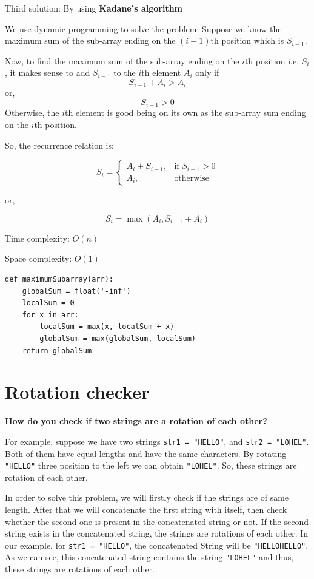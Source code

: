 \documentclass[a4paper,11pt]{book}
\begin{document}
\noindent Third solution: By using \textbf{Kadane's algorithm}

\noindent We use dynamic programming to solve the problem. Suppose we know the maximum sum of the sub-array ending on the $(i-1)$th position which is $S_{i-1}$.

\noindent Now, to find the maximum sum of the sub-array ending on the $i$th position i.e. $S_i$, it makes sense to add $S_{i-1}$ to the $i$th element $A_i$ only if 
$$S_{i-1} + A_i > A_i$$
or,
$$S_{i-1} > 0$$
\noindent Otherwise, the $i$th element is good being on its own as the sub-array sum ending on the $i$th position.

\noindent So, the recurrence relation is:

\[
    S_i = 
\begin{cases}
    A_i + S_{i-1} ,& \text{if } S_{i-1} > 0\\
    A_i,              & \text{otherwise}
\end{cases}
\]

or,

$$S_i = \max(A_i, S_{i-1} + A_i)$$

\noindent Time complexity: $O(n)$

\noindent Space complexity: $O(1)$

\begin{lstlisting}
def maximumSubarray(arr):
    globalSum = float('-inf')
    localSum = 0
    for x in arr:
        localSum = max(x, localSum + x)
        globalSum = max(globalSum, localSum)
    return globalSum
\end{lstlisting}

\newpage
\section{Rotation checker}
\textbf{How do you check if two strings are a rotation of each other?}
\vspace{5mm}

\noindent For example, suppose we have two strings \lstinline{str1 = "HELLO"}, and \lstinline{str2 = "LOHEL"}. Both of them have equal lengths and have the same characters. By rotating \lstinline{"HELLO"} three position to the left we can obtain \lstinline{"LOHEL"}. So, these strings are rotation of each other.

\noindent In order to solve this problem, we will firstly check if the strings are of same length. After that we will concatenate the first string with itself, then check whether the second one is present in the concatenated string or not. If the second string exists in the concatenated string, the strings are rotations of each other. In our example, for \lstinline{str1 = "HELLO"},  the concatenated String will be \lstinline{"HELLOHELLO"}. As we can see, this concatenated string contains the string \lstinline{"LOHEL"} and thus, these strings are rotations of each other.
\vspace{5mm}
\end{document}
